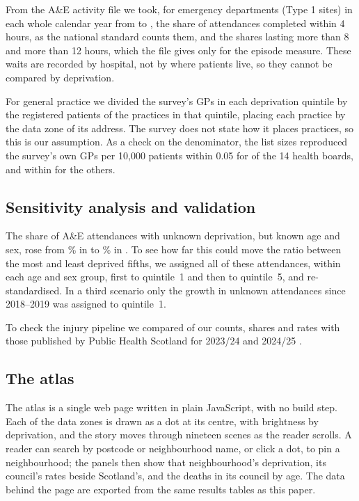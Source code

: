 \documentclass[11pt,a4paper]{article}
\begin{document}
From the A\&E activity file we took, for emergency departments (Type 1 sites) in each whole
calendar year from \waitsFirstYear{} to \waitsLastYear{}, the share of attendances completed within 4
hours, as the national standard counts them, and the shares lasting more than 8 and more than 12
hours, which the file gives only for the episode measure. These waits are recorded by hospital, not
by where patients live, so they cannot be compared by deprivation.

For general practice we divided the survey's GPs in each deprivation quintile by the registered
patients of the practices in that quintile, placing each practice by the data zone of its address.
The survey does not state how it places practices, so this is our assumption. As a check on the
denominator, the list sizes reproduced the survey's own GPs per 10{,}000 patients within 0.05 for
\gpBoardsClose{} of the 14 health boards, and within \gpBoardWorst{} for the others.

\subsection{Sensitivity analysis and validation}

The share of A\&E attendances with unknown deprivation, but known age and sex, rose from
\unknownFirst\% in \aeFirstYear{} to \unknownLast\% in \aeLastYear{}. To see how far this could move
the ratio between the most and least deprived fifths, we assigned all of these attendances, within
each age and sex group, first to quintile~1 and then to quintile~5, and re-standardised. In a third
scenario only the growth in unknown attendances since 2018--2019 was assigned to quintile~1.

To check the injury pipeline we compared \valCount{} of our counts, shares and rates with those
published by Public Health Scotland for 2023/24 and 2024/25 \citep{phsinjuries2024}.

\subsection{The atlas}

The atlas is a single web page written in plain JavaScript, with no build step. Each of the
\zonesTotal{} data zones is drawn as a dot at its centre, with brightness by deprivation, and the
story moves through nineteen scenes as the reader scrolls. A reader can search by postcode or
neighbourhood name, or click a dot, to pin a neighbourhood; the panels then show that
neighbourhood's deprivation, its council's rates beside Scotland's, and the deaths in its council by
age. The data behind the page are exported from the same results tables as this paper.
\end{document}
